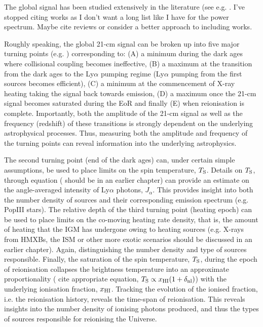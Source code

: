 The global signal has been studied extensively in the literature (see e.g. \cite{Furlanetto:2006c,Pritchard:2010a,Mirocha:2013,Mirocha:2014,Mirocha:2015,Mirocha:2017,Cohen:2017,Mirocha:2018}. {\color{red} I've stopped citing works as I don't want a long list like I have for the power spectrum. Maybe cite reviews or consider a better approach to including works}.

Roughly speaking, the global 21-cm signal can be broken up into five major turning points (e.g. \cite{Furlanetto:2006b,Pritchard:2010a}) corresponding to: (A) a minimum during the dark ages where collisional coupling becomes ineffective, (B) a maximum at the transition from the dark ages to the Ly$\alpha$ pumping regime (Ly$\alpha$ pumping from the first sources becomes efficient), (C) a minimum at the commencement of X-ray heating taking the signal back towards emission, (D) a maximum once the 21-cm signal becomes saturated during the EoR and finally (E) when reionisation is complete. Importantly, both the amplitude of the 21-cm signal as well as the frequency (redshift) of these transitions is strongly dependent on the underlying astrophysical processes. Thus, measuring both the amplitude and frequency of the turning points can reveal information into the underlying astrophysics.

The second turning point (end of the dark ages) can, under certain simple assumptions, be used to place limits on the spin temperature, $T_{\rm S}$. Details on $T_{\rm S}$, through equation ({\color{red} should be in an earlier chapter}) can provide an estimate on the angle-averaged intensity of Ly$\alpha$ photons, $J_{\alpha}$. This provides insight into both the number density of sources and their corresponding emission spectrum (e.g. PopIII stars). The relative depth of the third turning point (heating epoch) can be used to place limits on the co-moving heating rate density, that is, the amount of heating that the IGM has undergone owing to heating sources (e.g. X-rays from HMXBs, the ISM or other more exotic scenarios {\color{red} should be discussed in an earlier chapter}). Again, distinguishing the number density and type of sources responsible. Finally, the saturation of the spin temperature, $T_{\rm S}$, during the epoch of reionisation collapses the brightness temperature into an approximate proportionality ({\color{red} cite appropriate equation}, $T_{\rm S} \propto x_{\rm H{\scriptstyle I}}(1+\delta_{\rm nl})$) with the underlying ionisation fraction, $x_{\rm H{\scriptstyle I}}$. Tracking the evolution of the ionised fraction, i.e. the reionisation history, reveals the time-span of reionisation. This reveals insights into the number density of ionising photons produced, and thus the types of sources responsible for reionising the Universe.

